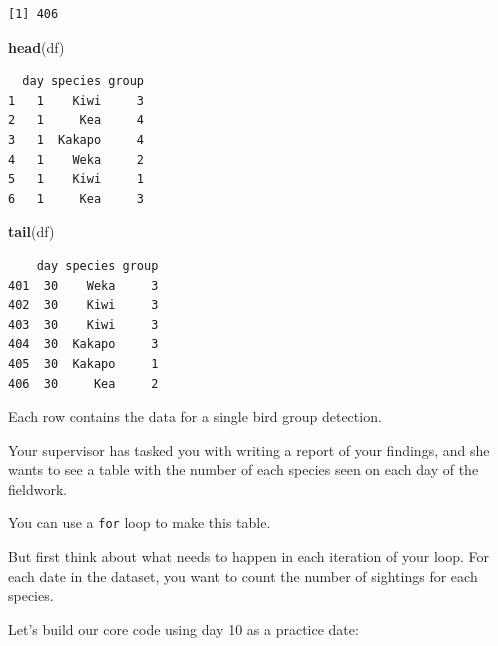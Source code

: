 \documentclass[
]{book}
\newenvironment{Shaded}{\begin{snugshade}}{\end{snugshade}}
\newcommand{\CommentTok}[1]{\textcolor[rgb]{0.56,0.35,0.01}{\textit{#1}}}
\newcommand{\DecValTok}[1]{\textcolor[rgb]{0.00,0.00,0.81}{#1}}
\newcommand{\KeywordTok}[1]{\textcolor[rgb]{0.13,0.29,0.53}{\textbf{#1}}}
\newcommand{\NormalTok}[1]{#1}
\newcommand{\OperatorTok}[1]{\textcolor[rgb]{0.81,0.36,0.00}{\textbf{#1}}}
\newcommand{\StringTok}[1]{\textcolor[rgb]{0.31,0.60,0.02}{#1}}
\begin{document}
\begin{verbatim}
[1] 406
\end{verbatim}

\begin{Shaded}
\begin{Highlighting}[]
\KeywordTok{head}\NormalTok{(df)}
\end{Highlighting}
\end{Shaded}

\begin{verbatim}
  day species group
1   1    Kiwi     3
2   1     Kea     4
3   1  Kakapo     4
4   1    Weka     2
5   1    Kiwi     1
6   1     Kea     3
\end{verbatim}

\begin{Shaded}
\begin{Highlighting}[]
\KeywordTok{tail}\NormalTok{(df)}
\end{Highlighting}
\end{Shaded}

\begin{verbatim}
    day species group
401  30    Weka     3
402  30    Kiwi     3
403  30    Kiwi     3
404  30  Kakapo     3
405  30  Kakapo     1
406  30     Kea     2
\end{verbatim}

Each row contains the data for a single bird group detection.

Your supervisor has tasked you with writing a report of your findings, and she wants to see a table with the number of each species seen on each day of the fieldwork.

You can use a \texttt{for} loop to make this table.

But first think about what needs to happen in each iteration of your loop. For each date in the dataset, you want to count the number of sightings for each species.

Let's build our core code using day 10 as a practice date:

\begin{Shaded}
\end{Shaded}
\end{document}
